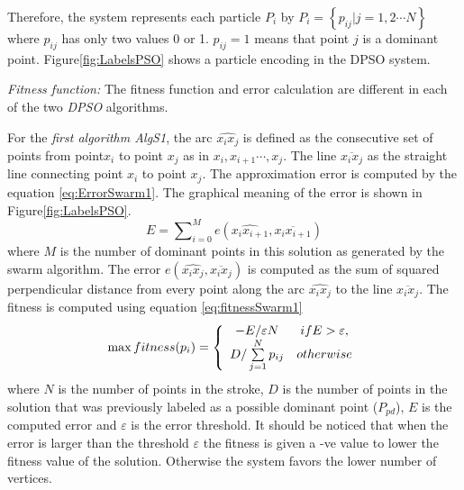 \documentclass{article}
\begin{document}
Therefore, the system represents each particle $P_i$ by $P_i = \left\{ {p_{ij} \left| {j = 1,2 \cdots N} \right.} \right\}$ where $p_{ij}$ has only two values 0 or 1. $p_{ij}=1$ means that point $j$ is a dominant point. Figure\ref{fig:LabelsPSO} shows a particle encoding in the DPSO system. 

\textsl{Fitness function:} The fitness function and error calculation are different in each of the two \textit{DPSO} algorithms. 

For the \textit{first algorithm \textsl{AlgS1}}, 
 the arc $\widehat{x_ix_j}$ is defined as the consecutive set of points from point$x_i$ to point $x_{j}$ as in $x_i,x_{i+1} \cdots,x_j$. The line $\overline{x_i x_j} $ as the straight line connecting point $x_i$ to point $x_j$. The approximation error is computed by the equation \ref{eq:ErrorSwarm1}. The graphical meaning of the error is shown in Figure\ref{fig:LabelsPSO}.
\begin{equation}
E=\sum\nolimits_{i = 0}^M e ( \widehat{x_ix_{i+1}},\overline{x_i x_{i+1}})
\label{eq:ErrorSwarm1}
\end{equation} where $M$ is the number of dominant points in this solution as generated by the swarm algorithm. The error $e ( \widehat{x_ix_j},\overline{x_i x_j})$ is computed as the sum of squared perpendicular distance from every point along the arc $\widehat{x_ix_j}$ to the line $\overline{x_i x_j}$. The fitness is computed using equation \ref{eq:fitnessSwarm1}\begin{equation}
\max fitness(p_i ) = \left\{ {\begin{array}{*{20}c}
   { - E/\varepsilon N} & {ifE > \varepsilon ,}  \\
   {D/\sum\limits_{j = 1}^N {p_{ij} } } & {otherwise}  \\
\end{array}} \right.
\label{eq:fitnessSwarm1}
\end{equation} where $N$ is the number of points in the stroke, $D$ is the number of points in the solution that was previously labeled as a possible dominant point ($P_{pd}$), $E$ is the computed error and $\varepsilon$ is the error threshold. It should be noticed that when the error is larger than the threshold $\varepsilon$ the fitness is given a -ve value to lower the fitness value of the solution. Otherwise the system favors the lower number of vertices.
\end{document}
